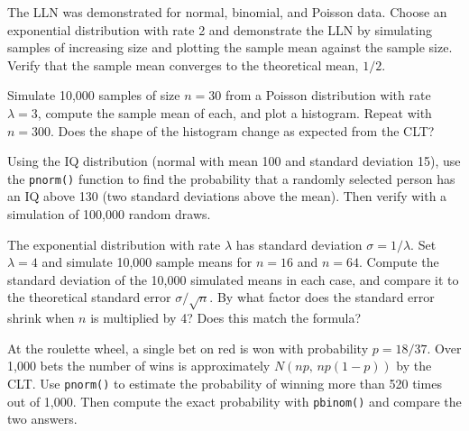\begin{exercise}
The LLN was demonstrated for normal, binomial, and Poisson data. Choose an
exponential distribution with rate 2 and demonstrate the LLN by simulating
samples of increasing size and plotting the sample mean against the sample
size. Verify that the sample mean converges to the theoretical mean, $1/2$.
\end{exercise}

\begin{exercise}
Simulate 10,000 samples of size $n=30$ from a Poisson distribution with rate
$\lambda=3$, compute the sample mean of each, and plot a histogram. Repeat
with $n=300$. Does the shape of the histogram change as expected from the CLT?
\end{exercise}

\begin{exercise}
Using the IQ distribution (normal with mean 100 and standard deviation 15),
use the \lstinline{pnorm()} function to find the probability that a randomly
selected person has an IQ above 130 (two standard deviations above the mean).
Then verify with a simulation of 100,000 random draws.
\end{exercise}

\begin{exercise}
The exponential distribution with rate $\lambda$ has standard deviation
$\sigma = 1/\lambda$. Set $\lambda = 4$ and simulate 10,000 sample means
for $n = 16$ and $n = 64$. Compute the standard deviation of the 10,000
simulated means in each case, and compare it to the theoretical standard
error $\sigma/\sqrt{n}$. By what factor does the standard error shrink when
$n$ is multiplied by 4?  Does this match the formula?
\end{exercise}

\begin{exercise}
At the roulette wheel, a single bet on red is won with probability $p=18/37$.
Over 1,000 bets the number of wins is approximately
$N\!\left(np,\,np(1-p)\right)$ by the CLT.
Use \lstinline{pnorm()} to estimate the probability of winning more than 520
times out of 1,000. Then compute the exact probability with
\lstinline{pbinom()} and compare the two answers.
\end{exercise}

